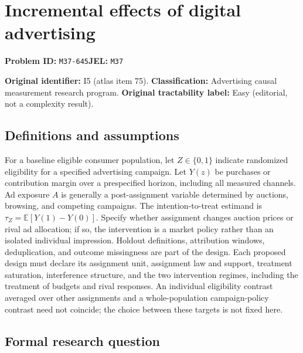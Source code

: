 \documentclass[11pt,a4paper]{article}
\begin{document}
\section*{Incremental effects of digital advertising}
\textbf{Problem ID:} \texttt{M37-645}\quad \textbf{JEL:} \texttt{M37}\par
\label{problem:OP-0075}
\label{atlas:prob:I5}

\noindent\textbf{Original identifier:} I5 (atlas item 75). \textbf{Classification:} Advertising causal measurement research program. \textbf{Original tractability label:} Easy (editorial, not a complexity result).

\subsection*{Definitions and assumptions}

For a baseline eligible consumer population, let $Z\in\{0,1\}$ indicate randomized eligibility for a specified advertising campaign. Let $Y(z)$ be purchases or contribution margin over a prespecified horizon, including all measured channels. Ad exposure $A$ is generally a post-assignment variable determined by auctions, browsing, and competing campaigns. The intention-to-treat estimand is $\tau_Z=\mathbb E[Y(1)-Y(0)]$. Specify whether assignment changes auction prices or rival ad allocation; if so, the intervention is a market policy rather than an isolated individual impression. Holdout definitions, attribution windows, deduplication, and outcome missingness are part of the design. Each proposed design must declare its assignment unit, assignment law and support, treatment saturation, interference structure, and the two intervention regimes, including the treatment of budgets and rival responses. An individual eligibility contrast averaged over other assignments and a whole-population campaign-policy contrast need not coincide; the choice between these targets is not fixed here.

\subsection*{Formal research question}
\end{document}
